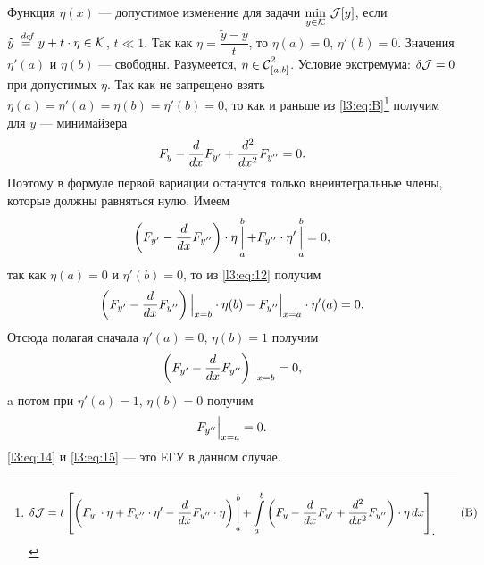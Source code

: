 Функция $\eta(x)$ --- допустимое изменение для задачи $\min\limits_{y\in\K}\,\J[y]$, если $\tilde{y}\eqdef y+t\cdot\eta\in\K$, $t\ll1$. Так как $\eta=\dfrac{\tilde{y}-y}{t}$, то $\eta(a)=0$, $\eta'(b)=0$. Значения $\eta'(a)$ и $\eta(b)$ --- свободны. Разумеется, $\eta\in\Cfn[{[a,b]}]{2}$. Условие экстремума: $\delta\J=0$ при допустимых $\eta$. Так как не запрещено взять $\eta(a)=\eta'(a)=\eta(b)=\eta'(b)=0$, то как и раньше из \eqref{l3:eq:B}\footnote{\begin{equation*}
		\hfill\delta\J=t\left[\left(F_{y'}\cdot\eta+F_{y''}\cdot\eta'-\der{}{x}F_{y''}\cdot\eta\right)\mathop{\Big|}\limits_a^b+\int\limits_a^b\left(F_{y}-\der{}{x}F_{y'}+\dder{}{x}F_{y''}\right)\cdot\eta\,dx\right]_{\displaystyle.}\hfill\tag{B}
\end{equation*}} получим для $y$ --- минимайзера
\begin{equation*}
	\hfill F_y-\der{}{x}F_{y'}+\dder{}{x}F_{y''}=0.\hfill
\end{equation*}
Поэтому в формуле первой вариации останутся только внеинтегральные члены, которые должны равняться нулю. Имеем
\begin{equation}
	\label{l3:eq:12}
	\hfill\left(F_{y'}-\der{}{x}F_{y''}\right)\cdot\eta\mathop{\Big|}\limits_a^b+F_{y''}\cdot\eta'\mathop{\Big|}\limits_a^b=0,\hfill
\end{equation}
так как $\eta(a)=0$ и $\eta'(b)=0$, то из \eqref{l3:eq:12} получим
\begin{equation}
	\label{l3:eq:13}
	\hfill\left(F_{y'}-\der{}{x}F_{y''}\right)\Big|_{x=b}\cdot\eta(b)-F_{y''}\Big|_{x=a}\cdot\eta'(a)=0.\hfill
\end{equation}
Отсюда полагая сначала $\eta'(a)=0$, $\eta(b)=1$ получим
\begin{equation}
	\label{l3:eq:14}
	\hfill\left(F_{y'}-\der{}{x}F_{y''}\right)\Big|_{x=b}=0,\hfill
\end{equation}
a потом при $\eta'(a)=1$, $\eta(b)=0$ получим 
\begin{equation}
	\label{l3:eq:15}
	\hfill F_{y''}\Big|_{x=a}=0.\hfill
\end{equation}
\eqref{l3:eq:14} и \eqref{l3:eq:15} --- это ЕГУ в данном случае.

